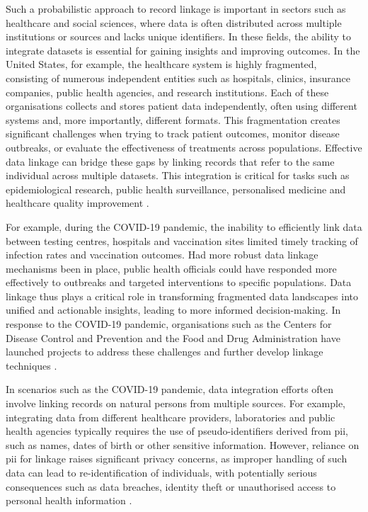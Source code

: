 Such a probabilistic approach to record linkage is important in sectors such as healthcare and social sciences, where data is often distributed across multiple institutions or sources and lacks unique identifiers. 
In these fields, the ability to integrate datasets is essential for gaining insights and improving outcomes.
In the United States, for example, the healthcare system is highly fragmented, consisting of numerous independent entities such as hospitals, clinics, insurance companies, public health agencies, and research institutions. 
Each of these organisations collects and stores patient data independently, often using different systems and, more importantly, different formats. 
This fragmentation creates significant challenges when trying to track patient outcomes, monitor disease outbreaks, or evaluate the effectiveness of treatments across populations.
Effective data linkage can bridge these gaps by linking records that refer to the same individual across multiple datasets.
This integration is critical for tasks such as epidemiological research, public health surveillance, personalised medicine and healthcare quality improvement \cite{pathak2024privacy, vatsalan2017privacy}.

For example, during the COVID-19 pandemic, the inability to efficiently link data between testing centres, hospitals and vaccination sites limited timely tracking of infection rates and vaccination outcomes. 
Had more robust data linkage mechanisms been in place, public health officials could have responded more effectively to outbreaks and targeted interventions to specific populations. 
Data linkage thus plays a critical role in transforming fragmented data landscapes into unified and actionable insights, leading to more informed decision-making.
In response to the COVID-19 pandemic, organisations such as the Centers for Disease Control and Prevention and the Food and Drug Administration have launched projects to address these challenges and further develop linkage techniques \cite{pathak2024privacy}.

In scenarios such as the COVID-19 pandemic, data integration efforts often involve linking records on natural persons from multiple sources.
For example, integrating data from different healthcare providers, laboratories and public health agencies typically requires the use of pseudo-identifiers derived from \ac{pii}, such as names, dates of birth or other sensitive information. 
However, reliance on \ac{pii} for linkage raises significant privacy concerns, as improper handling of such data can lead to re-identification of individuals, with potentially serious consequences such as data breaches, identity theft or unauthorised access to personal health information \cite{pathak2024privacy, schnell2009privacy}.


